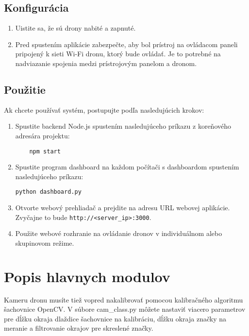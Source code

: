 \documentclass[a4paper]{feidipsp}
\begin{document}
\subsection{Konfigurácia}

\begin{enumerate}
    \item Uistite sa, že sú drony nabité a zapnuté.
    \item Pred spustením aplikácie zabezpečte, aby bol prístroj na ovládacom paneli pripojený k sieti Wi-Fi dronu, ktorý bude ovládať. Je to potrebné na nadviazanie spojenia medzi prístrojovým panelom a dronom.
\end{enumerate}

\subsection{Použitie}
Ak chcete používať systém, postupujte podľa nasledujúcich krokov:

\begin{enumerate}
    \item Spustite backend Node.js spustením nasledujúceho príkazu z koreňového adresára projektu:
    
    \begin{verbatim}
    npm start
    \end{verbatim}

    \item Spustite program dashboard na každom počítači s dashboardom spustením nasledujúceho príkazu:
    
\begin{verbatim}
python dashboard.py
\end{verbatim}
 
\item Otvorte webový prehliadač a prejdite na adresu URL webovej aplikácie. Zvyčajne to bude \texttt{http://<server\_ip>:3000}.
\item Použite webové rozhranie na ovládanie dronov v individuálnom alebo skupinovom režime.
\end{enumerate}

\section{Popis hlavnych modulov}

Kameru dronu musíte tiež vopred nakalibrovať pomocou kalibračného algoritmu šachovnice OpenCV. V súbore cam\_class.py môžete nastaviť viacero parametrov pre dĺžku okraja dlaždice šachovnice na kalibráciu, dĺžku okraja značky na meranie a filtrovanie okrajov pre skreslené značky.
\end{document}
